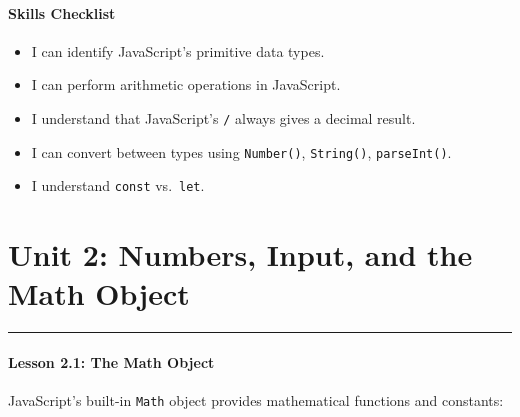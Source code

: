 \documentclass[
  justified,
  openright,
]{tufte-book}
\let\subsection\paragraph
\let\paragraph\paragraph
\let\subsection\paragraph
\let\paragraph\paragraph
\providecommand{\tightlist}{%
  \setlength{\itemsep}{0pt}\setlength{\parskip}{0pt}}
\begin{document}
\subsection{Skills Checklist}\label{skills-checklist-55}

\begin{itemize}
\tightlist
\item[$\square$]
  I can identify JavaScript's primitive data types.
\item[$\square$]
  I can perform arithmetic operations in JavaScript.
\item[$\square$]
  I understand that JavaScript's \texttt{/} always gives a decimal
  result.
\item[$\square$]
  I can convert between types using \texttt{Number()},
  \texttt{String()}, \texttt{parseInt()}.
\item[$\square$]
  I understand \texttt{const} vs.~\texttt{let}.
\end{itemize}

\newpage

\section{Unit 2: Numbers, Input, and the Math
Object}\label{unit-2-numbers-input-and-the-math-object}

\begin{center}\rule{0.5\linewidth}{0.5pt}\end{center}

\subsection{Lesson 2.1: The Math
Object}\label{lesson-2.1-the-math-object}

JavaScript's built-in \texttt{Math} object provides mathematical
functions and constants:
\end{document}
